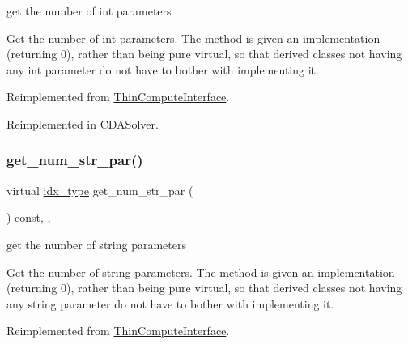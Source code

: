 get the number of int parameters 

Get the number of int parameters. The method is given an implementation (returning 0), rather than being pure virtual, so that derived classes not having any int parameter do not have to bother with implementing it. 

Reimplemented from \mbox{\hyperlink{class_s_m_spp__di__unipi__it_1_1_thin_compute_interface_a1e009f6b43f7966bf4b4740e0b4cff58}{Thin\+Compute\+Interface}}.



Reimplemented in \mbox{\hyperlink{class_s_m_spp__di__unipi__it_1_1_c_d_a_solver_a3ad74d9506761eb2ca4c8a936fb7a1c5}{C\+D\+A\+Solver}}.

\mbox{\label{class_s_m_spp__di__unipi__it_1_1_solver_a91f0341f09d59b3023fc95122a625125}} 
\subsubsection{\texorpdfstring{get\+\_\+num\+\_\+str\+\_\+par()}{get\_num\_str\_par()}}
{\footnotesize\ttfamily virtual \mbox{\hyperlink{class_s_m_spp__di__unipi__it_1_1_thin_compute_interface_aa3d710629ad8c434286726ad810c3b47}{idx\+\_\+type}} get\+\_\+num\+\_\+str\+\_\+par (\begin{DoxyParamCaption}\item[{void}]{ }\end{DoxyParamCaption}) const\hspace{0.3cm}{\ttfamily [inline]}, {\ttfamily [override]}, {\ttfamily [virtual]}}



get the number of string parameters 

Get the number of string parameters. The method is given an implementation (returning 0), rather than being pure virtual, so that derived classes not having any string parameter do not have to bother with implementing it. 

Reimplemented from \mbox{\hyperlink{class_s_m_spp__di__unipi__it_1_1_thin_compute_interface_a23ef8ba7477625aec4a54dddff053468}{Thin\+Compute\+Interface}}.

